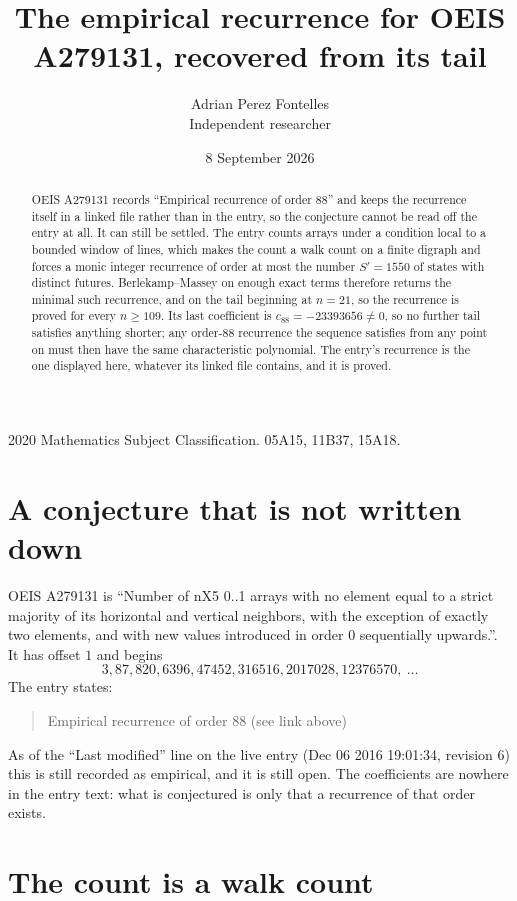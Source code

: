 \documentclass[11pt,a4paper]{article}
\title{The empirical recurrence for OEIS A279131, recovered from its tail}
\author{Adrian Perez Fontelles\\ \small Independent researcher}
\date{8 September 2026}
\theoremstyle{plain}
\theoremstyle{definition}
\begin{document}
\maketitle

\begin{abstract}
OEIS A279131 records ``Empirical recurrence of order $88$'' and keeps the recurrence itself in
a linked file rather than in the entry, so the conjecture cannot be read off the entry at all.
It can still be settled. The entry counts arrays under a condition local to a bounded window of
lines, which makes the count a walk count on a finite digraph and forces a monic integer
recurrence of order at most the number $S'=1550$ of states with distinct futures. Berlekamp--Massey on
enough exact terms therefore returns the minimal such recurrence, and on the tail beginning at $n=21$, so the recurrence is proved for every $n\ge109$.
Its last coefficient is $c_{88}=-23393656\neq0$, so no further tail satisfies anything
shorter; any order-$88$ recurrence the sequence satisfies from any point on must then have
the same characteristic polynomial. The entry's recurrence is the one displayed here, whatever
its linked file contains, and it is proved.
\end{abstract}

\noindent\small 2020 Mathematics Subject Classification. 05A15, 11B37, 15A18.\normalsize

\section{A conjecture that is not written down}

OEIS A279131 is ``Number of nX5 0..1 arrays with no element equal to a strict majority of its horizontal and vertical neighbors, with the exception of exactly two elements, and with new values introduced in order 0 sequentially upwards.''. It has offset $1$ and begins
\[
3, 87, 820, 6396, 47452, 316516, 2017028, 12376570,\ \dots
\]
The entry states:
\begin{quote}
Empirical recurrence of order 88 (see link above)
\end{quote}
As of the ``Last modified'' line on the live entry (Dec 06 2016 19:01:34, revision 6)
this is still recorded as empirical, and it is still open. The coefficients are nowhere in the
entry text: what is conjectured is only that a recurrence of that order exists.

\section{The count is a walk count}
\end{document}
